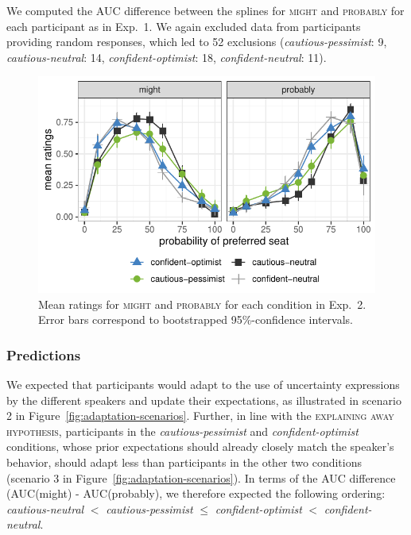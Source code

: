 \documentclass[man,floatsintext]{apa6}
\begin{document}
We computed the AUC difference between the splines for  \textsc{might} and \textsc{probably} for each participant as in Exp.~1. We again excluded data from participants providing random responses, which led to 52 exclusions (\textit{cautious-pessimist}: 9, \textit{cautious-neutral}: 14, \textit{confident-optimist}: 18, \textit{confident-neutral}: 11).

\begin{figure}[t]
    \centering
    \includegraphics[width=.5\columnwidth]{explaining-away.pdf}
    \caption{Mean ratings for \textsc{might} and \textsc{probably} for each condition in Exp.~2. Error bars correspond to bootstrapped 95\%-confidence intervals.}
    \label{fig:results-exp2}
\end{figure}
\subsubsection{Predictions}

We expected that participants would adapt to the use of uncertainty expressions by the different speakers and update their expectations, as illustrated in scenario 2 in Figure~\ref{fig:adaptation-scenarios}. Further, in line with the \textsc{explaining away hypothesis}, participants in the \textit{cautious-pessimist} and \textit{confident-optimist} conditions, whose prior expectations should already closely match the speaker's behavior,  should adapt less than participants in the other two conditions (scenario 3 in Figure~\ref{fig:adaptation-scenarios}). In terms of the AUC difference (AUC(might) - AUC(probably), we therefore expected the following ordering: \textit{cautious-neutral} $<$  \textit{cautious-pessimist} $\leq$ \textit{confident-optimist} $<$ \textit{confident-neutral}.
\end{document}
